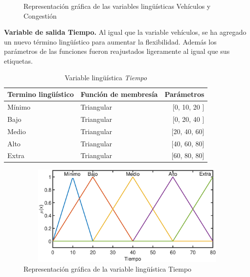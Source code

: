 \begin{figure}[H]
	\centering
	\caption[Gráficas de las variables lingüísticas vehículos y congestión]{Representación gráfica de las variables lingüísticas Vehículos y Congestión }
\end{figure}

\pagebreak
\textbf{Variable de salida Tiempo.} Al igual que la variable vehículos, se ha agregado un nuevo término lingüístico para aumentar la flexibilidad. Además los parámetros de las funciones fueron reajustados ligeramente al igual que sus etiquetas.

\begin{table}[!h]
	\centering
	\begin{tabular}{llr} \toprule
		Termino lingüístico & Función de membresía & Parámetros \\ \midrule
		Mínimo & Triangular & [0, 10, 20 ] \\
		Bajo & Triangular & [0, 20, 40 ] \\
		Medio & Triangular & [20, 40, 60] \\
		Alto & Triangular & [40, 60, 80] \\
		Extra & Triangular & [60, 80, 80] \\ \bottomrule
	\end{tabular}
	\caption{Variable lingüística \textit{Tiempo}}
\end{table}

\begin{figure}[H]
	\centering
	\includegraphics[height=5cm, width=12cm]{Variables/ConfigC_output1.eps}
	\caption[Gráfica variable lingüística tiempo - C]{Representación gráfica de la variable lingüística Tiempo}
\end{figure}

